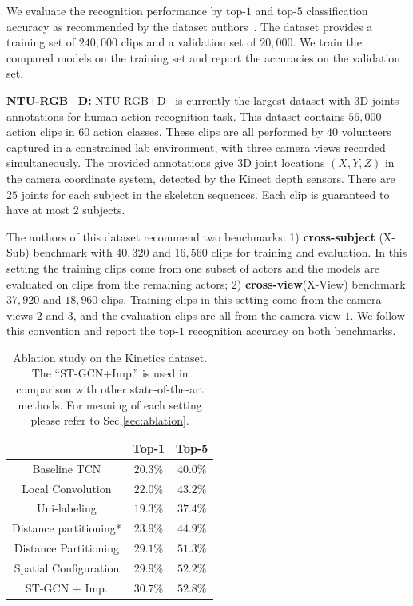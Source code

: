 \documentclass[letterpaper]{article} %
\begin{document}
We evaluate the recognition performance by  top-$1 $ and  top-$5 $ classification accuracy as recommended by the dataset authors~\cite{Kay2017Kinetics}. 
The dataset provides a training set of $ 240,000 $ clips and a validation set of $ 20,000 $.
We train the compared models on the training set and report the accuracies on the validation set.


\textbf{NTU-RGB+D:}
NTU-RGB+D~\cite{Shahroudy2016CVPR} is currently the largest dataset with 3D joints annotations for human action recognition task.
This dataset contains $ 56,000 $ action clips in $60$ action classes.
These clips are all performed by $ 40 $ volunteers captured in a constrained lab environment, with three camera views recorded simultaneously.
The provided annotations give 3D joint locations $ (X, Y, Z) $ in the camera coordinate system, detected by the Kinect depth sensors. 
There are $ 25 $ joints for each subject in the skeleton sequences.
Each clip is guaranteed to have at most $ 2 $ subjects.

The authors of this dataset recommend two benchmarks: 
1) \textbf{cross-subject} (X-Sub) benchmark with $ 40,320 $ and $ 16,560 $ clips for training and evaluation. In this setting the training clips come from one subset of actors and the models are evaluated on clips from the remaining actors; 
2) \textbf{cross-view}(X-View) benchmark $ 37,920 $ and $ 18,960 $ clips. Training clips in this setting come from the camera views $ 2 $ and $ 3 $, and the evaluation clips are all from the camera view $ 1 $.
We follow this convention and report the top-$1$ recognition accuracy on both benchmarks.



\begin{table}
	\centering
	\begin{tabular}{c|c|c}
		\hline
		& Top-1 & Top-5 \\ \hline
		Baseline TCN			& 	$20.3\%$ & $40.0\%$\\\hline
		Local Convolution	& 	$22.0\%$ &$43.2\%$ \\\hline
		Uni-labeling	& $19.3\%$	& $37.4\%$\\
		Distance partitioning*	& $23.9\%$	&$44.9\%$  \\
		Distance Partitioning	& $29.1\%$& $51.3\%$ \\
		Spatial Configuration	& $29.9\%$& $52.2\%$ \\\hline
		ST-GCN + Imp.					& $\mathbf{30.7\%}$& $\mathbf{52.8\%}$ \\\hline
	\end{tabular}
	\caption{Ablation study on the Kinetics dataset. The ``ST-GCN+Imp.'' is used in comparison with other state-of-the-art methods.
		For meaning of each setting please refer to Sec.\ref{sec:ablation}. }\label{tab:ablation}
\end{table}
\end{document}
